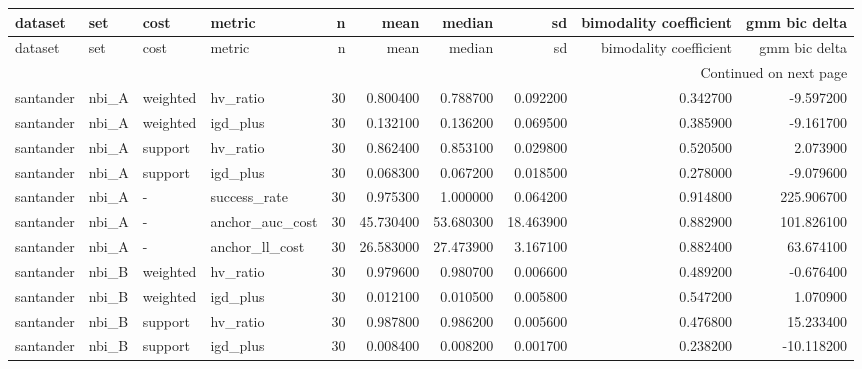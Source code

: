 \begin{landscape}
\begin{center}\label{tab:s6reg}\end{center}
\begingroup\tiny\setlength{\tabcolsep}{2.5pt}
\begin{longtable}{llllrrrrrr}
\toprule
dataset & set & cost & metric & n & mean & median & sd & bimodality coefficient & gmm bic delta \\
\midrule
\endfirsthead
\toprule
dataset & set & cost & metric & n & mean & median & sd & bimodality coefficient & gmm bic delta \\
\midrule
\endhead
\midrule
\multicolumn{10}{r}{Continued on next page} \\
\midrule
\endfoot
\bottomrule
\endlastfoot
santander & nbi\_A & weighted & hv\_ratio & 30 & 0.800400 & 0.788700 & 0.092200 & 0.342700 & -9.597200 \\
santander & nbi\_A & weighted & igd\_plus & 30 & 0.132100 & 0.136200 & 0.069500 & 0.385900 & -9.161700 \\
santander & nbi\_A & support & hv\_ratio & 30 & 0.862400 & 0.853100 & 0.029800 & 0.520500 & 2.073900 \\
santander & nbi\_A & support & igd\_plus & 30 & 0.068300 & 0.067200 & 0.018500 & 0.278000 & -9.079600 \\
santander & nbi\_A & - & success\_rate & 30 & 0.975300 & 1.000000 & 0.064200 & 0.914800 & 225.906700 \\
santander & nbi\_A & - & anchor\_auc\_cost & 30 & 45.730400 & 53.680300 & 18.463900 & 0.882900 & 101.826100 \\
santander & nbi\_A & - & anchor\_ll\_cost & 30 & 26.583000 & 27.473900 & 3.167100 & 0.882400 & 63.674100 \\
santander & nbi\_B & weighted & hv\_ratio & 30 & 0.979600 & 0.980700 & 0.006600 & 0.489200 & -0.676400 \\
santander & nbi\_B & weighted & igd\_plus & 30 & 0.012100 & 0.010500 & 0.005800 & 0.547200 & 1.070900 \\
santander & nbi\_B & support & hv\_ratio & 30 & 0.987800 & 0.986200 & 0.005600 & 0.476800 & 15.233400 \\
santander & nbi\_B & support & igd\_plus & 30 & 0.008400 & 0.008200 & 0.001700 & 0.238200 & -10.118200 \\

\end{longtable}
\end{landscape}
